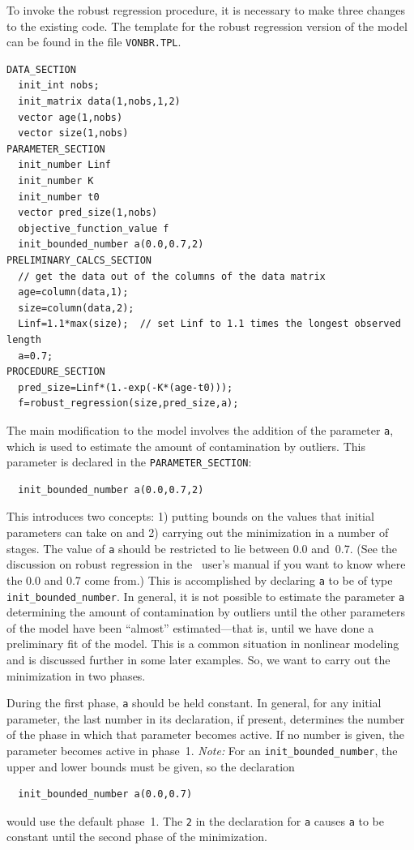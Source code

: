 \documentclass{admbmanual}
\newcommand\PS{\texttt{PARAMETER\_SECTION}}
\begin{document}
To invoke the robust regression procedure, it is necessary to
make three changes to the existing code. The template for the
robust regression version of the model can be found in the
file \texttt{VONBR.TPL}. 
\begin{lstlisting}
DATA_SECTION
  init_int nobs;
  init_matrix data(1,nobs,1,2)
  vector age(1,nobs)
  vector size(1,nobs)
PARAMETER_SECTION
  init_number Linf
  init_number K
  init_number t0
  vector pred_size(1,nobs)
  objective_function_value f
  init_bounded_number a(0.0,0.7,2)
PRELIMINARY_CALCS_SECTION
  // get the data out of the columns of the data matrix 
  age=column(data,1);
  size=column(data,2);
  Linf=1.1*max(size);  // set Linf to 1.1 times the longest observed length
  a=0.7;
PROCEDURE_SECTION
  pred_size=Linf*(1.-exp(-K*(age-t0)));
  f=robust_regression(size,pred_size,a);
\end{lstlisting}
The main modification to the model involves the addition of the 
parameter \texttt{a}, which is used to 
estimate the amount of contamination by outliers.  
This parameter is declared in the
\PS:
\begin{lstlisting}
  init_bounded_number a(0.0,0.7,2)
\end{lstlisting}
This introduces two concepts: 1) putting bounds on the
values that initial parameters can take on and 2) carrying out 
the minimization in a number of stages. The value of \texttt{a}
should be restricted to lie between 0.0 and~0.7. 
(See the discussion on robust regression in the \scAD\ user's
manual if you want to know where the 0.0 and 0.7 come from.)
This is accomplished by declaring \texttt{a} to be of type
\texttt{init\_bounded\_number}.
In general, it is not possible to estimate the parameter \texttt{a}
determining the amount of contamination by outliers until the other
parameters of the model have been ``almost'' estimated---that is,
until we have done a preliminary fit of the model. This is a common
situation in nonlinear modeling and is discussed further in some
later examples. So,
we want to carry out the minimization in two phases. 

During the
first phase, \texttt{a} should be held constant.  In general,
for any initial parameter, the last number in its declaration,
if present, determines the number of the phase in which that
parameter becomes active. If no number is given, the parameter
becomes active in phase~1. \textit{Note:} For an \texttt{init\_bounded\_number},
the upper and lower bounds must be given, so the declaration
\begin{lstlisting}
  init_bounded_number a(0.0,0.7)
\end{lstlisting}
would use the default phase~1.
The \texttt{2} in the
declaration for \texttt{a} causes \texttt{a} to be constant until the second
phase of the minimization.  
\end{document}

